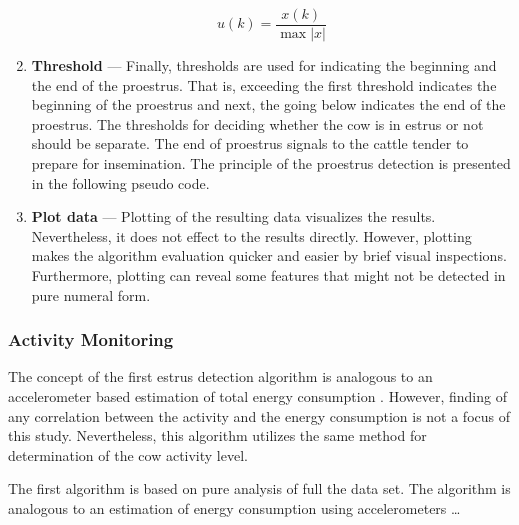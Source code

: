 \documentclass[english,12pt,a4paper,pdftex,elec,utf8]{aaltothesis}
\newcommand{\Clanguage}{\lstset{
  language=C++,                %
  basicstyle=\ttfamily,
  title=\lstname,                 %
}}
\begin{document}
\begin{enumerate}
\begin{equation}
u(k) = \frac{x(k)}{\max  \left| x \right|} 
\end{equation}


\item \textbf{Threshold} --- Finally, thresholds are used for indicating the beginning and the end of the proestrus. That is, exceeding the first threshold indicates the beginning of the proestrus and next, the going below indicates the end of the proestrus. The thresholds for deciding whether the cow is in estrus or not should be separate. The end of proestrus signals to the cattle tender to prepare for insemination. The principle of the proestrus detection is presented in the following pseudo code.  


\item \textbf{Plot data} --- Plotting of the resulting data visualizes the results. Nevertheless, it does not effect to the results directly. However, plotting makes the algorithm evaluation quicker and easier by brief visual inspections. Furthermore, plotting can reveal some features that might not be detected in pure numeral form.

\end{enumerate}


\subsubsection{Activity Monitoring} \label{activitymeasurementsection}

The concept of the first estrus detection algorithm is analogous to an accelerometer based estimation of total energy consumption \cite{Kang2012}. However, finding of any correlation between the activity and the energy consumption is not a focus of this study. Nevertheless, this algorithm utilizes the same method for determination of the cow activity level. 


The first algorithm is based on pure analysis of full the data set. The algorithm is analogous to an estimation of energy consumption using accelerometers   \dots 
\end{document}
